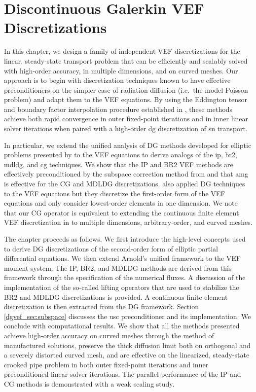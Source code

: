 \documentclass[../doc.tex]{subfiles}
\begin{document}
\chapter{Discontinuous Galerkin VEF Discretizations} \label{chap:dgvef}
In this chapter, we design a family of independent VEF discretizations for the linear, steady-state transport problem that can be efficiently and scalably solved with high-order accuracy, in multiple dimensions, and on curved meshes. Our approach is to begin with discretization techniques known to have effective preconditioners on the simpler case of radiation diffusion (i.e.~the model Poisson problem) and adapt them to the VEF equations. 
By using the Eddington tensor and boundary factor interpolation procedure established in \cite{two-level-independent-warsa}, these methods achieve both rapid convergence in outer fixed-point iterations and in inner linear solver iterations when paired with a high-order \gls{dg} discretization of \gls{sn} transport. 

In particular, we extend the unified analysis of DG methods developed for elliptic problems presented by \textcite{Arnold2002} to the VEF equations to derive analogs of the \gls{ip}, \gls{br2}, \gls{mdldg}, and \gls{cg} techniques.
We show that the IP and BR2 VEF methods are effectively preconditioned by the subspace correction method from \textcite{Pazner2021} and that \gls{amg} is effective for the CG and MDLDG discretizations.
\textcite{dima_dfem} also applied DG techniques to the VEF equations but they discretize the first-order form of the VEF equations and only consider lowest-order elements in one dimension.
We note that our CG operator is equivalent to extending the continuous finite element VEF discretization in \cite{two-level-independent-warsa} to multiple dimensions, arbitrary-order, and curved meshes.

The chapter proceeds as follows. We first introduce the high-level concepts used to derive DG discretizations of the second-order form of elliptic partial differential equations. 
We then extend Arnold's unified framework to the VEF moment system. The IP, BR2, and MDLDG methods are derived from this framework through the specification of the numerical fluxes. A discussion of the implementation of the so-called lifting operators that are used to stabilize the BR2 and MDLDG discretizations is provided.
A continuous finite element discretization is then extracted from the DG framework.  
Section \ref{dgvef_sec:subspace} discusses the \gls{usc} preconditioner and its implementation. 
We conclude with computational results.
We show that all the methods presented achieve high-order accuracy on curved meshes through the method of manufactured solutions, preserve the thick diffusion limit both on orthogonal and a severely distorted curved mesh, and are effective on the linearized, steady-state crooked pipe problem in both outer fixed-point iterations and inner preconditioned linear solver iterations.
The parallel performance of the IP and CG methods is demonstrated with a weak scaling study.
\end{document}
